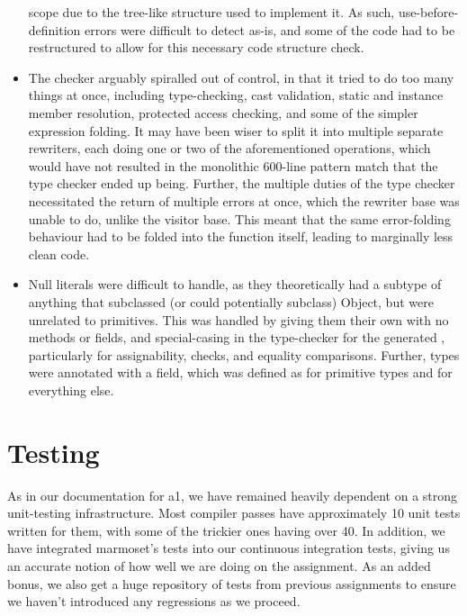 \documentclass{article}
\begin{document}
\begin{itemize}
         scope due to the tree-like structure used to implement it. As such, use-before-definition errors were difficult
         to detect as-is, and some of the code had to be restructured to allow for this necessary code structure check.
   \item The checker arguably spiralled out of control, in that it tried to do too many things at once, including type-checking,
         cast validation, static and instance member resolution, protected access checking, and some of the simpler
         expression folding. It may have been wiser to split it into multiple separate rewriters, each doing one or two of
         the aforementioned operations, which would have not resulted in the monolithic 600-line pattern match that the
         type checker ended up being. Further, the multiple duties of the type checker necessitated the return of multiple
         errors at once, which the rewriter base was unable to do, unlike the visitor base. This meant that the same
         error-folding behaviour had to be folded into the function itself, leading to marginally less clean code.
    \item Null literals were difficult to handle, as they theoretically had a subtype of anything that subclassed (or could potentially
          subclass) Object, but were unrelated to primitives. This was handled by giving them their own 
          with no methods or fields, and special-casing in the type-checker for the generated , particularly for
          assignability,  checks, and equality comparisons. Further, types were annotated with a \value{nullable}
          field, which was defined as \value{false} for primitive types and \value{true} for everything else.
\end{itemize}




\section{Testing}

As in our documentation for a1, we have remained heavily dependent on a strong unit-testing infrastructure. Most
compiler passes have approximately 10 unit tests written for them, with some of the trickier ones having over 40. In
addition, we have integrated marmoset's tests into our continuous integration tests, giving us an accurate notion of how
well we are doing on the assignment. As an added bonus, we also get a huge repository of tests from previous assignments
to ensure we haven't introduced any regressions as we proceed.

\testsrc{*}
\end{document}

